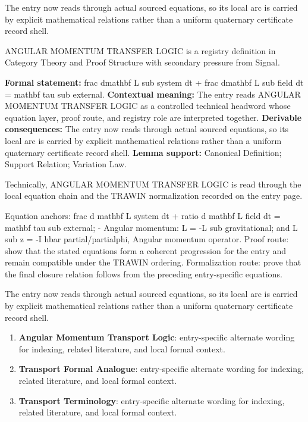 The entry now reads through actual sourced equations, so its local arc is carried by explicit mathematical relations rather than a uniform quaternary certificate record shell.
\clearpage


\begingroup\small
{}
ANGULAR MOMENTUM TRANSFER LOGIC is a registry definition in Category Theory and Proof Structure with secondary pressure from Signal.

\begingroup\footnotesize\setlength{\emergencystretch}{3em}\sloppy
\textbf{Formal statement:} frac dmathbf L sub system dt + frac dmathbf L sub field dt = mathbf tau sub external. \textbf{Contextual meaning:} The entry reads ANGULAR MOMENTUM TRANSFER LOGIC as a controlled technical headword whose equation layer, proof route, and registry role are interpreted together. \textbf{Derivable consequences:} The entry now reads through actual sourced equations, so its local arc is carried by explicit mathematical relations rather than a uniform quaternary certificate record shell. \textbf{Lemma support:} Canonical Definition; Support Relation; Variation Law.\par
\endgroup

Technically, ANGULAR MOMENTUM TRANSFER LOGIC is read through the local equation chain and the TRAWIN normalization recorded on the entry page.

Equation anchors: frac d mathbf L system dt + ratio d mathbf L field dt = mathbf tau sub external; - Angular momentum: L = -L sub gravitational; and L sub z = -I hbar partial/partialphi, Angular momentum operator. Proof route: show that the stated equations form a coherent progression for the entry and remain compatible under the TRAWIN ordering. Formalization route: prove that the final closure relation follows from the preceding entry-specific equations.

The entry now reads through actual sourced equations, so its local arc is carried by explicit mathematical relations rather than a uniform quaternary certificate record shell.
\endgroup

\begin{enumerate}[leftmargin=1.6em,itemsep=6pt,topsep=4pt]
\item \textbf{Angular Momentum Transport Logic}: entry-specific alternate wording for indexing, related literature, and local formal context.
\item \textbf{Transport Formal Analogue}: entry-specific alternate wording for indexing, related literature, and local formal context.
\item \textbf{Transport Terminology}: entry-specific alternate wording for indexing, related literature, and local formal context.
\end{enumerate}

